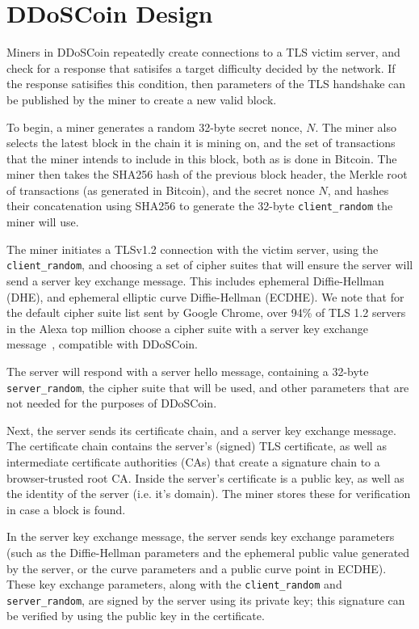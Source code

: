 \section{DDoSCoin Design}

Miners in DDoSCoin repeatedly create connections to a TLS victim server, and
check for a response that satisifes a target difficulty decided by the network.
If the response satisifies this condition, then parameters of the TLS handshake
can be published by the miner to create a new valid block.

To begin, a miner generates a random 32-byte secret nonce, $N$. The miner also
selects the latest block in the chain it is mining on, and the set of
transactions that the miner intends to include in this block, both as is done in
Bitcoin. The miner then takes the SHA256 hash of the previous block header, the
Merkle root of transactions (as generated in Bitcoin), and the secret nonce $N$,
and hashes their concatenation using SHA256 to generate the
32-byte \texttt{client\_random} the miner will use.

The miner initiates a TLSv1.2 connection with the victim server, using the
\texttt{client\_random}, and choosing a set of cipher suites that will ensure
the server will send a server key exchange message. This includes ephemeral
Diffie-Hellman (DHE), and ephemeral elliptic curve Diffie-Hellman (ECDHE). We
note that for the default cipher suite list sent by Google Chrome, over 94\%
of TLS 1.2 servers in the Alexa top million choose a cipher suite with a server key exchange
message~\cite{censys}, compatible with DDoSCoin.


The server will respond with a server hello message, containing a 32-byte
\texttt{server\_random}, the cipher suite that will be used, and other
parameters that are not needed for the purposes of DDoSCoin.

Next, the server sends its certificate chain, and a server key exchange message.
The certificate chain contains the server's (signed) TLS certificate, as well as
intermediate certificate authorities (CAs) that create a signature chain to a
browser-trusted root CA. Inside the server's certificate is a public
key, as well as the identity of the server (i.e. it's domain). The miner stores
these for verification in case a block is found.

In the server key exchange message, the server sends key exchange parameters
(such as the Diffie-Hellman parameters and the ephemeral public value generated
by the server, or the curve parameters and a public curve point in ECDHE). These
key exchange parameters, along with the \texttt{client\_random} and
\texttt{server\_random},  are signed by the server using its private key; this
signature can be verified by using the public key in the certificate.

